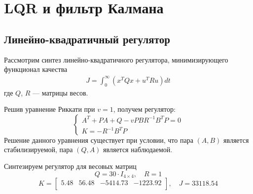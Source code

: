 \section{LQR и фильтр Калмана}
\subsection{Линейно-квадратичный регулятор}
Рассмотрим синтез линейно-квадратичного регулятора, минимизирующего функционал качества 
\begin{eqnarray}
J = \int_{0}^{\infty} \left( x^T Q x + u^T R u \right) dt
\end{eqnarray}
где $Q$, $R$ --- матрицы весов.

Решив уравнение Риккати при $v = 1$, получем регулятор:
\begin{equation}
    \begin{cases}
        A^T + PA + Q - vPBR^{-1}B^TP = 0 \\ 
        K = -R^{-1}B^TP
    \end{cases}
\end{equation}
Решение данного уравнения существует при условии, что пара $(A, B)$ является стабилизируемой, 
пара $(Q, A)$ является наблюдаемой. 

Синтезируем регулятор для весовых матриц 
\begin{equation}
    Q = 30 \cdot I_{4\times 4}, \quad R = 1
\end{equation}
\begin{equation}
    K = \begin{bmatrix}
        5.48  & 56.48  & -5414.73  & -1223.92 \\ 
    \end{bmatrix}, \quad J = 33118.54
\end{equation}

